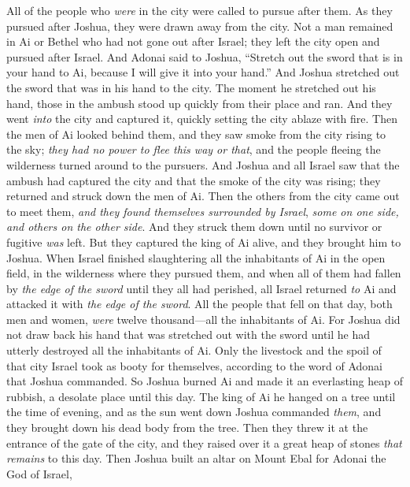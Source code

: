 \begin{biblechapter}
\verse All of the people who \textit{were} in the city were called to pursue after them. As they pursued after Joshua, they were drawn away from the city.
\verse Not a man remained in Ai or Bethel who had not gone out after Israel; they left the city open and pursued after Israel.
\verse And Adonai said to Joshua, “Stretch out the sword that is in your hand to Ai, because I will give it into your hand.” And Joshua stretched out the sword that was in his hand to the city.
\verse The moment he stretched out his hand, those in the ambush stood up quickly from their place and ran. And they went \textit{into} the city and captured it, quickly setting the city ablaze with fire.
\verse Then the men of Ai looked behind them, and they saw smoke from the city rising to the sky; \textit{they had no power to flee this way or that}, and the people fleeing the wilderness turned around to the pursuers.
\verse And Joshua and all Israel saw that the ambush had captured the city and that the smoke of the city was rising; they returned and struck down the men of Ai.
\verse Then the others from the city came out to meet them, \textit{and they found themselves surrounded by Israel}, \textit{some on one side, and others on the other side}. And they struck them down until no survivor or fugitive \textit{was} left.
\verse But they captured the king of Ai alive, and they brought him to Joshua.
\verse When Israel finished slaughtering all the inhabitants of Ai in the open field, in the wilderness where they pursued them, and when all of them had fallen by \textit{the edge of the sword} until they all had perished, all Israel returned \textit{to} Ai and attacked it with \textit{the edge of the sword}.
\verse All the people that fell on that day, both men and women, \textit{were} twelve thousand—all the inhabitants of Ai.
\verse For Joshua did not draw back his hand that was stretched out with the sword until he had utterly destroyed all the inhabitants of Ai.
\verse Only the livestock and the spoil of that city Israel took as booty for themselves, according to the word of Adonai that Joshua commanded.
\verse So Joshua burned Ai and made it an everlasting heap of rubbish, a desolate place until this day.
\verse The king of Ai he hanged on a tree until the time of evening, and as the sun went down Joshua commanded \textit{them}, and they brought down his dead body from the tree. Then they threw it at the entrance of the gate of the city, and they raised over it a great heap of stones \textit{that remains} to this day.
 Then Joshua built an altar on Mount Ebal for Adonai the God of Israel,

\end{biblechapter}
